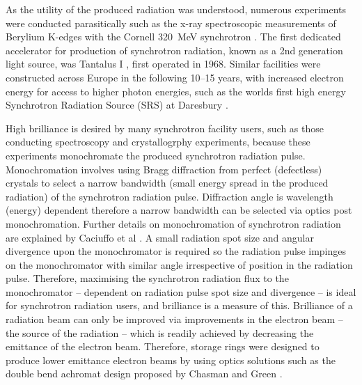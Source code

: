 \documentclass[../main.tex]{subfiles}
\begin{document}
As the utility of the produced radiation was understood, numerous experiments were conducted parasitically such as the x-ray spectroscopic measurements of Berylium K-edges with the Cornell 320~\si{\mega\electronvolt} synchrotron \cite{johnston1954absorption}. The first dedicated accelerator for production of synchrotron radiation, known as a 2nd generation light source, was Tantalus I \cite{rowe1973tantalus}, first operated in 1968. Similar facilities were constructed across Europe in the following 10--15 years, with increased electron energy for access to higher photon energies, such as the worlds first high energy Synchrotron Radiation Source (SRS) at Daresbury \cite{munro2019fifty,robinson1981experiments}. 

High brilliance is desired by many synchrotron facility users, such as those conducting spectroscopy and crystallogrphy experiments, because these experiments monochromate the produced synchrotron radiation pulse. Monochromation involves using Bragg diffraction from perfect (defectless) crystals to select a narrow bandwidth (small energy spread in the produced radiation) of the synchrotron radiation pulse. Diffraction angle is wavelength (energy) dependent therefore a narrow bandwidth can be selected via optics post monochromation. Further details on monochromation of synchrotron radiation are explained by Caciuffo et al \cite{caciuffo1987monochromators}. A small radiation spot size and angular divergence upon the monochromator is required so the radiation pulse impinges on the monochromator with similar angle irrespective of position in the radiation pulse. Therefore, maximising the synchrotron radiation flux to the monochromator -- dependent on radiation pulse spot size and divergence -- is ideal for synchrotron radiation users, and brilliance is a measure of this. Brilliance of a radiation beam can only be improved via improvements in the electron beam -- the source of the radiation -- which is readily achieved by decreasing the emittance of the electron beam. Therefore, storage rings were designed to produce lower emittance electron beams by using optics solutions such as the double bend achromat design proposed by Chasman and Green \cite{chasman1975preliminary}.          
\end{document}

